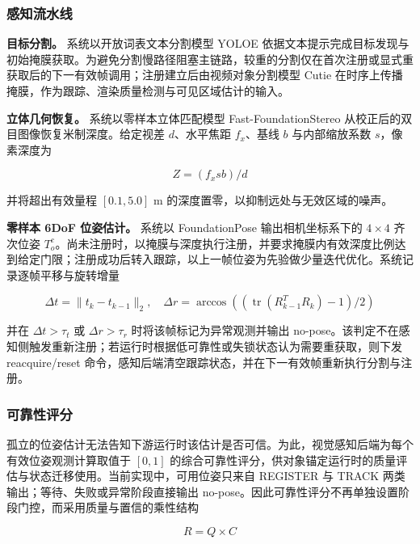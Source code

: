 \documentclass[review]{vgtc}
\begin{document}
\subsubsection{感知流水线}


\textbf{目标分割。} 系统以开放词表文本分割模型 YOLOE 依据文本提示完成目标发现与初始掩膜获取。为避免分割慢路径阻塞主链路，较重的分割仅在首次注册或显式重获取后的下一有效帧调用；注册建立后由视频对象分割模型 Cutie 在时序上传播掩膜，作为跟踪、渲染质量检测与可见区域估计的输入。

\textbf{立体几何恢复。} 系统以零样本立体匹配模型 Fast-FoundationStereo 从校正后的双目图像恢复米制深度。给定视差 $d$、水平焦距 $f_x$、基线 $b$ 与内部缩放系数 $s$，像素深度为

\begin{equation}
Z = (f_x s b) / d
\label{eq:depth}
\end{equation}


并将超出有效量程 $[0.1, 5.0]$ m 的深度置零，以抑制远处与无效区域的噪声。

\textbf{零样本 6DoF 位姿估计。} 系统以 FoundationPose 输出相机坐标系下的 $4 \times 4$ 齐次位姿 $T^c_o$。尚未注册时，以掩膜与深度执行注册，并要求掩膜内有效深度比例达到给定门限；注册成功后转入跟踪，以上一帧位姿为先验做少量迭代优化。系统记录逐帧平移与旋转增量

\begin{equation}
\Delta t = \lVert t_k - t_{k - 1} \rVert_2, \quad \Delta r = \arccos\!\left((\operatorname{tr}\!\left(R_{k - 1}^T R_k\right) - 1) / 2\right)
\label{eq:posejump}
\end{equation}


并在 $\Delta t > \tau_t$ 或 $\Delta r > \tau_r$ 时将该帧标记为异常观测并输出 no-pose。该判定不在感知侧触发重新注册；若运行时根据低可靠性或失锁状态认为需要重获取，则下发 reacquire/reset 命令，感知后端清空跟踪状态，并在下一有效帧重新执行分割与注册。

\subsubsection{可靠性评分}\label{sec:reliability}


孤立的位姿估计无法告知下游运行时该估计是否可信。为此，视觉感知后端为每个有效位姿观测计算取值于 $[0, 1]$ 的综合可靠性评分，供对象锚定运行时的质量评估与状态迁移使用。当前实现中，可用位姿只来自 REGISTER 与 TRACK 两类输出；等待、失败或异常阶段直接输出 no-pose。因此可靠性评分不再单独设置阶段门控，而采用质量与置信的乘性结构

\begin{equation}
R = Q \times C
\label{eq:reliability}
\end{equation}
\end{document}
